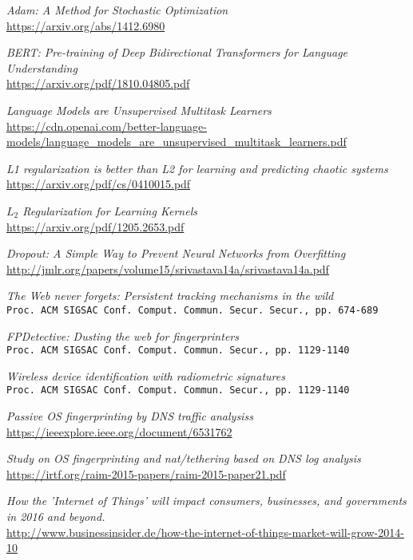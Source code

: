\begin{thebibliography}{99}
\textit{Adam: A Method for Stochastic Optimization}
\\\url{https://arxiv.org/abs/1412.6980}

\textit{BERT: Pre-training of Deep Bidirectional Transformers for
Language Understanding}
\\\url{https://arxiv.org/pdf/1810.04805.pdf}

\textit{Language Models are Unsupervised Multitask Learners}
\\\url{https://cdn.openai.com/better-language-models/language_models_are_unsupervised_multitask_learners.pdf}



\textit{L1 regularization is better than L2 for learning and predicting chaotic systems
}
\\\url{https://arxiv.org/pdf/cs/0410015.pdf}

\textit{$L_2$ Regularization for Learning Kernels}
\\\url{https://arxiv.org/pdf/1205.2653.pdf}

\textit{Dropout: A Simple Way to Prevent Neural Networks from Overfitting}
\\\url{http://jmlr.org/papers/volume15/srivastava14a/srivastava14a.pdf}


\textit{The Web never forgets: Persistent tracking mechanisms in the wild}
\\\texttt{Proc. ACM SIGSAC Conf. Comput. Commun. Secur. Secur., pp. 674-689}

\textit{FPDetective: Dusting the web for fingerprinters}
\\\texttt{Proc. ACM SIGSAC Conf. Comput. Commun. Secur., pp. 1129-1140}

\textit{Wireless device identification with radiometric signatures}
\\\texttt{Proc. ACM SIGSAC Conf. Comput. Commun. Secur., pp. 1129-1140}

\textit{Passive OS fingerprinting by DNS traffic analysiss}
\\\url{https://ieeexplore.ieee.org/document/6531762}

\textit{Study on OS fingerprinting and nat/tethering based on DNS log analysis}
\\\url{https://irtf.org/raim-2015-papers/raim-2015-paper21.pdf}


\textit{How the ’Internet of Things’ will impact consumers,
businesses, and governments in 2016 and beyond.}
\\\url{http://www.businessinsider.de/how-the-internet-of-things-market-will-grow-2014-10}


\end{thebibliography}

